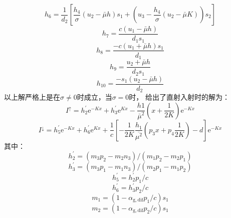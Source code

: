 \begin{equation}
  h_{6}=\frac{1}{d_{2}}\left[\frac{h_{4}}{\sigma}\left(u_{2}-\bar{\mu} h\right)
  s_{1}+\left(u_{3}-\frac{h_{4}}{\sigma}\left(u_{2}-\bar{\mu} K\right)\right) s_{2}\right]
\end{equation}
\begin{equation}
  h_{7}=\frac{c\left(u_{1}-\bar{\mu} h\right)}{d_{1} s_{1}}
\end{equation}
\begin{equation}
  h_{8}=\frac{-c\left(u_{1}+\bar{\mu} h\right) s_{1}}{d_{1}}
\end{equation}
\begin{equation}
  h_{9}=\frac{u_{2}+\bar{\mu} h}{d_{2} s_{1}}
\end{equation}
\begin{equation}
  h_{10}=\frac{-s_{1}\left(u_{2}-\bar{\mu} h\right)}{d_{2}}
\end{equation}
以上解严格上是在$\sigma \neq 0$时成立，当$\sigma = 0$时，\citet{dai2004two} 给出了直射入射时的解为：
\begin{equation}
  I^{\uparrow}=h_{2}^{\prime} {\mathrm e}^{-K x}+h_{3}^{\prime} {\mathrm e}^{K x}-\frac{h 1}{\bar{\mu}^{2}}\left(x+\frac{1}{2 K}\right) {\mathrm e}^{-K x}
\end{equation}
\begin{equation}
  I^{\downarrow}=h_{5}^{\prime} {\mathrm e}^{-K x}+h_{6}^{\prime} {\mathrm e}^{K x}+\frac{1}{c}\left[-\frac{1}{2 K}
  \frac{h_{1}}{\overline{\mu^{2}}}\left(p_{3} x+p_{4} \frac{1}{2 K}\right)-d\right] {\mathrm e}^{-K x}
\end{equation}
其中：
\begin{equation}
  h_{2}^{\prime}=\left(m_{3} p_{2}-m_{2} n_{3}\right) /\left(m_{1} p_{2}-m_{2} p_{1}\right)
\end{equation}
\begin{equation}
  h_{3}^{\prime}=\left(m_{3} p_{1}-m_{1} n_{3}\right) /\left(m_{2} p_{1}-m_{1} p_{2}\right)
\end{equation}
\begin{equation}
  h_{5}^{\prime}=h_{2}^{\prime} p_{1} / c
\end{equation}
\begin{equation}
  h_{6}^{\prime}=h_{3}^{\prime} p_{2} / c
\end{equation}
\begin{equation}
  m_{1}=\left(1-\alpha_{\mathrm{g, dif}} p_{1} / c\right) s_{1}
\end{equation}
\begin{equation}
  m_{2}=\left(1-\alpha_{\mathrm{g, dif }} p_{2} / c\right) s_{1}
\end{equation}
